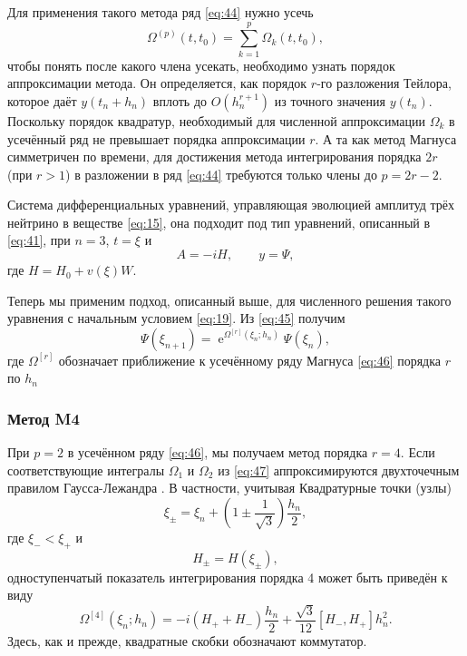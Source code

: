 \documentclass[a4paper,12pt]{article}
\renewcommand{\exp}{\operatorname{e}}
\begin{document}
	Для применения такого метода ряд \eqref{eq:44} нужно усечь
	\begin{equation}\label{eq:46}
		\Omega^{(p)}(t,t_0)=\sum_{k=1}^{p}\Omega_{k}(t,t_0),
	\end{equation}
	чтобы понять после какого члена усекать, необходимо узнать порядок аппроксимации метода. Он определяется, как порядок \(r\)-го разложения Тейлора, которое даёт \(y(t_{n}+h_n)\) вплоть до \(O(h_n^{r+1})\) из точного значения \(y(t_{n})\). Поскольку порядок квадратур, необходимый для численной аппроксимации \(\Omega_{k}\) в усечённый ряд не превышает порядка аппроксимации \(r\). А та как метод Магнуса симметричен по времени, для достижения метода интегрирования порядка \(2r\) (при \( r > 1\)) в разложении в ряд \eqref{eq:44} требуются только члены до \(p = 2r - 2\).

	Система дифференциальных уравнений, управляющая эволюцией амплитуд трёх нейтрино в веществе \eqref{eq:15}, она подходит под тип уравнений, описанный в \eqref{eq:41}, при \(n=3\), \(t=\xi\) и
	\begin{equation}
		A=-iH,\qquad y=\Psi,
	\end{equation}
	где \(H=H_{0}+ v(\xi)W\).

	Теперь мы применим подход, описанный выше, для численного решения такого уравнения с начальным условием \eqref{eq:19}. Из \eqref{eq:45} получим
	\begin{equation}
		\Psi(\xi_{n+1})=\exp^{\Omega^{[r]}(\xi_n;h_n)}\Psi(\xi_n),
	\end{equation}
	где \(\Omega^{[r]}\) обозначает приближение к усечённому ряду Магнуса \eqref{eq:46} порядка \(r\) по \(h_n\)

\subsubsection{Метод M4}

	При \(p = 2\) в усечённом ряду \eqref{eq:46}, мы получаем метод порядка \(r = 4\). Если соответствующие интегралы \(\Omega_{1}\) и \(\Omega_{2}\) из \eqref{eq:47} аппроксимируются двухточечным правилом Гаусса-Лежандра \cite{68}. В частности, учитывая Квадратурные точки (узлы)
	\begin{equation}
		\xi_{\pm} = \xi_{n} + (1 \pm \frac{1}{\sqrt{3}})\frac{h_n}{2},
	\end{equation}
	где \(\xi_{-}<\xi_{+}\) и
	\begin{equation}
		H_{\pm} = H(\xi_{\pm}),
	\end{equation}
	одноступенчатый показатель интегрирования порядка 4 может быть приведён к виду
	\begin{equation}\label{eq:49}
		\Omega^{[4]}(\xi_n;h_n)=-i(H_+ + H_-)\frac{h_n}{2} +
\frac{\sqrt{3}}{12}[H_-, H_+]h_n^2.
	\end{equation}
	Здесь, как и прежде, квадратные скобки обозначают коммутатор.
\end{document}
